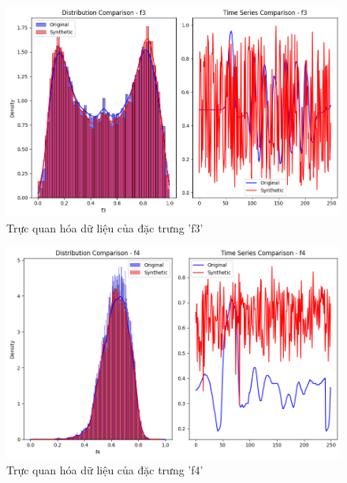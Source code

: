 \begin{figure}[H]
    \centering
    \includegraphics[width=1\textwidth]{Images/Improvement results/TimeGAN_f3.png}
    \caption{Trực quan hóa dữ liệu của đặc trưng 'f3'}
    \label{fig:timegan_data_f3}
\end{figure}

\begin{figure}[H]
    \centering
    \includegraphics[width=1\textwidth]{Images/Improvement results/TimeGAN_f4.png}
    \caption{Trực quan hóa dữ liệu của đặc trưng 'f4'}
    \label{fig:timegan_data_f4}
\end{figure}

